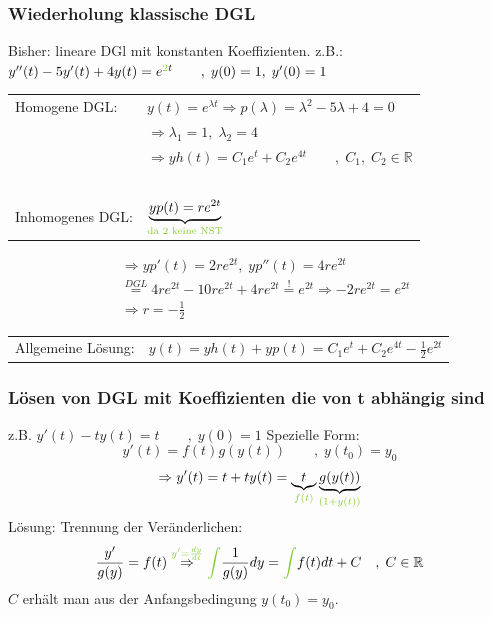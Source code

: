 \documentclass[12pt,a4paper]{article}%
\numberwithin{equation}{section}
\newcommand{\R}{\mathbb{R}} %
\def\colGreen#1{\begingroup\color{LimeGreen}{#1}\endgroup}
\def\ubGreen#1#2{\underbrace{#2}_{\colGreen{#1}}}
\numberwithin{equation}{subsection}
\begin{document}
  \subsubsection{Wiederholung klassische DGL}
  Bisher: lineare DGl mit konstanten Koeffizienten. \newline
  z.B.: $y''(t) - 5y'(t) + 4y(t) = e^{\colGreen{2}t} \qquad ,\; y(0) = 1,\; y'(0) = 1$ \newline
  \begin{tabularx}{14.7cm}{l l}
	  Homogene DGL: & $y(t) = e^{\lambda t} \Rightarrow p(\lambda) = \lambda^2 - 5 \lambda +4 = 0$ \\
	  $\;$ & $\Rightarrow \lambda_1 = 1, \; \lambda_2 = 4$ \\
	  $\;$ & $\Rightarrow yh(t) = C_1 e^t + C_2 e^{4t} \qquad ,\;C_1,\;C_2 \in \R$\\
	  $\;$ & $\;$ \\
	  Inhomogenes DGL: & $\ubGreen{\text{da 2 keine NST}}{yp(t) = re^{2t}}$\\
  \end{tabularx}  
  \begin{align*}
    &\Rightarrow yp'(t) = 2re^{2t},\; yp''(t) = 4re^{2t} \\
    &\overset{DGL}{=} 4re^{2t} - 10re^{2t} + 4re^{2t} \overset{!}{=} e^{2t} \Rightarrow -2re^{2t} = e^{2t}\\
    &\Rightarrow r = -\frac{1}{2}
  \end{align*} 
  \begin{tabularx}{14.7cm}{l l}
	  Allgemeine Lösung: & $y(t) = yh(t) + yp(t) = C_1 e^t + C_2 e^{4t} - \frac{1}{2} e^{2t}$
  \end{tabularx}
  
  \subsubsection{Lösen von DGL mit Koeffizienten die von t abhängig sind}
  z.B. $ y'(t) - ty(t) = t \qquad ,\; y(0) = 1$\newline
  \newline
  Spezielle Form: 
  \begin{equation}
    y'(t) = f(t) g(y(t)) \qquad,\; y(t_0) = y_0
  \end{equation}     
  \begin{align*}
    \Rightarrow y'(t) = t+ty(t) = \ubGreen{f(t)}{t} \ubGreen{(1+y(t))}{g(y(t))}
  \end{align*}
  Lösung: Trennung der Veränderlichen:
  \begin{align}
  \frac{y'}{g(y)} = f(t) \overset{\colGreen{y' = \frac{dy}{dt}}}{\Rightarrow} \colGreen{\int} \frac{1}{g(y)} dy = \colGreen{\int} f(t)dt +C \quad ,\;C\in\R
  \end{align}
  $C$ erhält man aus der Anfangsbedingung $y(t_0) = y_0$.
  \newpage
	
\end{document}
